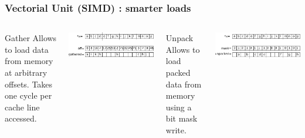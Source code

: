 \documentclass{beamer}
\begin{document}
\begin{frame}
  \frametitle{Vectorial Unit (SIMD) : smarter loads}
  
  \begin{columns}

    \begin{block}{Gather}
      Allows to load data from memory at arbitrary offsets. Takes one
      cycle per cache line accessed.
    \end{block}
    \includegraphics[width=\linewidth]{slides-figures/gather.pdf}

  
    \begin{block}{Unpack}
      Allows to load packed data from memory using a bit mask write.
    \end{block}
     
    \includegraphics[width=\linewidth]{slides-figures/unpack.pdf}
 
  \end{columns}
\end{frame}
\end{document}
